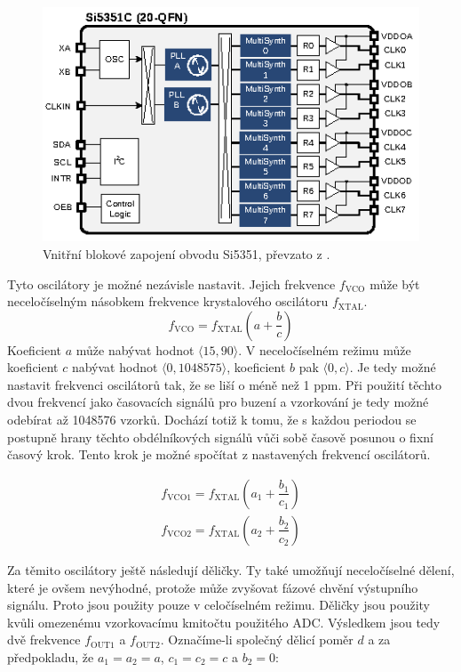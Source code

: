 \begin{figure}[htbp]
\includegraphics[width=\textwidth,keepaspectratio]{images/si5351_internal_architecture_overview.eps}\caption{Vnitřní blokové zapojení obvodu Si5351, převzato z \cite{Si5351datasheet}.} \label{si5351_internal_architecture_overview}
\end{figure}

Tyto oscilátory je možné nezávisle nastavit. Jejich frekvence $f_\mathrm{VCO}$ může být neceločíselným násobkem frekvence krystalového oscilátoru $f_\mathrm{XTAL}$.
\begin{equation}
f_\mathrm{VCO}=f_\mathrm{XTAL} \left(a+\dfrac{b}{c} \right)
\end{equation}
Koeficient $a$ může nabývat hodnot $\langle 15, 90 \rangle$. V neceločíselném režimu může koeficient $c$ nabývat hodnot $\langle 0, 1048575 \rangle$, koeficient $b$ pak $\langle 0, c \rangle$.
Je tedy možné nastavit frekvenci oscilátorů tak, že se liší o méně než 1 ppm. Při použití těchto dvou frekvencí jako časovacích signálů pro buzení a vzorkování je tedy možné odebírat až 1048576 vzorků. Dochází totiž k tomu, že s každou periodou se postupně hrany těchto obdélníkových signálů vůči sobě časově posunou o fixní časový krok. Tento krok je možné spočítat z nastavených frekvencí oscilátorů.

\begin{equation}
\begin{gathered}
f_\mathrm{VCO1}=f_\mathrm{XTAL} \left(a_1+\dfrac{b_1}{c_1} \right) \\
f_\mathrm{VCO2}=f_\mathrm{XTAL} \left(a_2+\dfrac{b_2}{c_2} \right)
\end{gathered}
\end{equation}

Za těmito oscilátory ještě následují děličky. Ty také umožňují neceločíselné dělení, které je ovšem nevýhodné, protože může zvyšovat fázové chvění výstupního signálu. Proto jsou použity pouze v celočíselném režimu. Děličky jsou použity kvůli omezenému vzorkovacímu kmitočtu použitého \acrshort{ADC}. Výsledkem jsou tedy dvě frekvence $f_\mathrm{OUT1}$ a $f_\mathrm{OUT2}$. Označíme-li společný dělicí poměr $d$ a za předpokladu, že $a_1=a_2=a$, $c_1=c_2=c$ a $b_2=0$:

